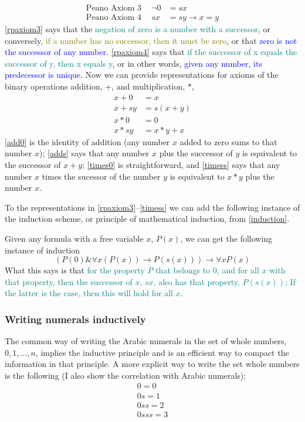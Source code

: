 \documentclass{article}
\begin{document}
\begin{align}
    \text{Peano Axiom 3} \ \quad \neg0 &= sx \label{rpaxiom3}\\
   \text{Peano Axiom 4} \ \quad sx &= sy \rightarrow x = y \label{rpaxiom4}
\end{align}
\ref{rpaxiom3} says that the \textcolor{teal}{negation of zero is a number with a successor}, or conversely, \textcolor{olive}{if a number has no successor, then it must be zero}, or that \textcolor{blue}{zero is not the successor of any number}. \ref{rpaxiom4} says that \textcolor{teal}{if the successor of x equals the successor of y, then x equals y}, or in other words, \textcolor{blue}{given any number, its predecessor is unique}. Now we can provide representations for axioms of the binary operations addition, $+$, and multiplication, $*$, 
\begin{align}
    x + 0 &= x\label{add0}\\
   x + sy &= s(x + y)\label{adds}\\
   x * 0 &= 0\label{times0}\\
   x * sy &= x * y + x\label{timess}
\end{align}
\ref{add0} is the identity of addition (any number $x$ added to zero sums to that number $x$); \ref{adds} says that any number $x$ plus the successor of $y$ is equivalent to the successor of $x + y$; \ref{times0} is straightforward, and \ref{timess} says that any number $x$ times the sucessor of the number $y$ is equivalent to $x * y$ plus the number $x$.

To the representations in \ref{rpaxiom3}--\ref{timess} we can add the following instance of the induction scheme, or principle of mathematical induction, from \ref{induction}.

Given any formula with a free variable $x$, $P(x)$, we can get the following instance of induction
\begin{equation}
    (P(0) \& \forall x(P(x)) \rightarrow P(s(x))) \longrightarrow \forall xP(x)
\end{equation}
What this says is that \textcolor{teal}{for the property $P$ that belongs to $0$, and for all $x$ with that property, then the successor of $x$, $sx$, also has that property, $P(s(x))$; If the latter is the case, then this will hold for all $x$}.

\subsubsection{Writing numerals inductively}
The common way of writing the Arabic numerals in the set of whole numbers, ${0, 1, \ldots, n}$, implies the inductive principle and is an efficient way to compact the information in that principle. A more explicit way to write the set whole numbers is the following (I also show the correlation with Arabic numerals):
\begin{equation}
    \begin{split}
        0 = 0\\
	 0s = 1\\
	 0ss = 2\\
	 0sss = 3
\end{split}
\end{equation}	
\end{document}
